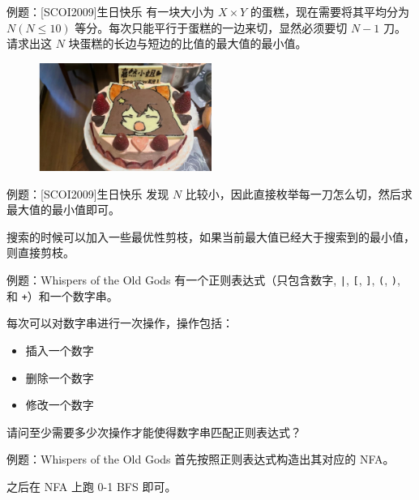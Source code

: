 \documentclass[12pt,aspectratio=169]{beamer}
\begin{document}
\begin{frame}[fragile]{例题：[SCOI2009]生日快乐}
  有一块大小为 $X \times Y$ 的蛋糕，现在需要将其平均分为 $N (N \le 10)$ 等分。每次只能平行于蛋糕的一边来切，显然必须要切 $N-1$ 刀。请求出这 $N$ 块蛋糕的长边与短边的比值的最大值的最小值。

  \begin{figure}
    \includegraphics[height=100pt]{jiaran.png}
  \end{figure}
\end{frame}

\begin{frame}[fragile]{例题：[SCOI2009]生日快乐}
  发现 $N$ 比较小，因此直接枚举每一刀怎么切，然后求最大值的最小值即可。

  搜索的时候可以加入一些最优性剪枝，如果当前最大值已经大于搜索到的最小值，则直接剪枝。
\end{frame}

\begin{frame}[fragile]{例题：Whispers of the Old Gods}
  有一个正则表达式（只包含数字, \verb!|!, \verb|[|, \verb|]|, \verb|(|, \verb|)|, 和 \verb|+|）和一个数字串。

  每次可以对数字串进行一次操作，操作包括：

  \begin{itemize}
    \item 插入一个数字
    \item 删除一个数字
    \item 修改一个数字
  \end{itemize}

  请问至少需要多少次操作才能使得数字串匹配正则表达式？
\end{frame}

\begin{frame}[fragile]{例题：Whispers of the Old Gods}
  首先按照正则表达式构造出其对应的 NFA。

  之后在 NFA 上跑 0-1 BFS 即可。
\end{frame}
\end{document}
